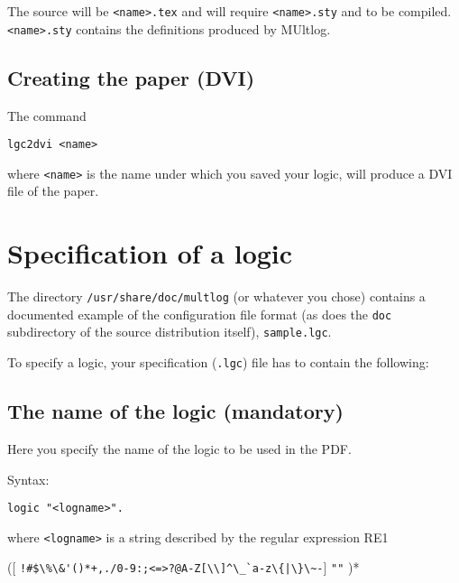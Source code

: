 \documentclass[]{article}
\newcommand{\passthrough}[1]{#1}
\begin{document}
The source will be \passthrough{\lstinline!<name>.tex!} and will require
\passthrough{\lstinline!<name>.sty!} and to be compiled.
\passthrough{\lstinline!<name>.sty!} contains the definitions produced
by MUltlog.

\hypertarget{creating-the-paper-dvi}{%
\subsection{Creating the paper (DVI)}\label{creating-the-paper-dvi}}

The command

\begin{lstlisting}
lgc2dvi <name>
\end{lstlisting}

where \passthrough{\lstinline!<name>!} is the name under which you saved
your logic, will produce a DVI file of the paper.

\hypertarget{specification-of-a-logic}{%
\section{Specification of a logic}\label{specification-of-a-logic}}

The directory \passthrough{\lstinline!/usr/share/doc/multlog!} (or
whatever you chose) contains a documented example of the configuration
file format (as does the \passthrough{\lstinline!doc!} subdirectory of
the source distribution itself), \passthrough{\lstinline!sample.lgc!}.

To specify a logic, your specification (\passthrough{\lstinline!.lgc!})
file has to contain the following:

\hypertarget{the-name-of-the-logic-mandatory}{%
\subsection{The name of the logic
(mandatory)}\label{the-name-of-the-logic-mandatory}}

Here you specify the name of the logic to be used in the PDF.

Syntax:

\begin{lstlisting}
logic "<logname>".
\end{lstlisting}

where \passthrough{\lstinline!<logname>!} is a string described by the
regular expression RE1

({[}
\passthrough{\lstinline"!#$\%\&'()*+,./0-9:;<=>?@A-Z[\\]^\_`a-z\{|\}\~-"}{]}
\textbar{} \passthrough{\lstinline!""!} )*
\end{document}

